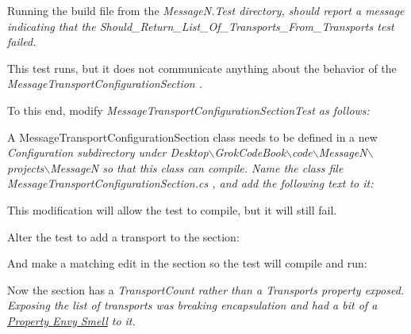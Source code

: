 

Running the build file from the \em MessageN.Test \em directory, should report a message indicating that the \em Should\_Return\_List\_Of\_Transports\_From\_Transports \em test failed.

This test runs, but it does not communicate anything about the behavior of the \em MessageTransportConfigurationSection \em.

To this end, modify \em MessageTransportConfigurationSectionTest \em as follows:



A MessageTransportConfigurationSection class needs to be defined in a new \em Configuration \em subdirectory under \em Desktop$\backslash$GrokCodeBook$\backslash$code$\backslash$MessageN$\backslash$projects$\backslash$MessageN \em so that this class can compile. Name the class file \em MessageTransportConfigurationSection.cs \em, and add the following text to it:



This modification will allow the test to compile, but it will still fail.

Alter the test to add a transport to the section:



And make a matching edit in the section so the test will compile and run:



Now the section has a \em TransportCount \em rather than a \em Transports \em property exposed. Exposing the list of transports was breaking encapsulation and had a bit of a \href{http://c2.com/cgi/wiki?FeatureEnvySmell}{Property Envy Smell} to it.